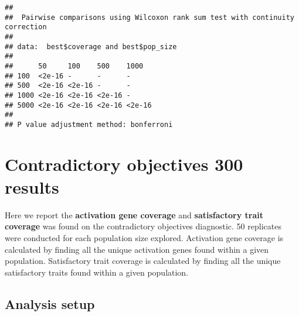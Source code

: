 \documentclass[
]{book}
\newenvironment{Shaded}{\begin{snugshade}}{\end{snugshade}}
\newcommand{\AttributeTok}[1]{\textcolor[rgb]{0.13,0.29,0.53}{#1}}
\newcommand{\CommentTok}[1]{\textcolor[rgb]{0.56,0.35,0.01}{\textit{#1}}}
\newcommand{\ConstantTok}[1]{\textcolor[rgb]{0.56,0.35,0.01}{#1}}
\newcommand{\FunctionTok}[1]{\textcolor[rgb]{0.13,0.29,0.53}{\textbf{#1}}}
\newcommand{\NormalTok}[1]{#1}
\newcommand{\OtherTok}[1]{\textcolor[rgb]{0.56,0.35,0.01}{#1}}
\newcommand{\SpecialCharTok}[1]{\textcolor[rgb]{0.81,0.36,0.00}{\textbf{#1}}}
\newcommand{\StringTok}[1]{\textcolor[rgb]{0.31,0.60,0.02}{#1}}
\begin{document}
\begin{verbatim}
## 
##  Pairwise comparisons using Wilcoxon rank sum test with continuity correction 
## 
## data:  best$coverage and best$pop_size 
## 
##      50     100    500    1000  
## 100  <2e-16 -      -      -     
## 500  <2e-16 <2e-16 -      -     
## 1000 <2e-16 <2e-16 <2e-16 -     
## 5000 <2e-16 <2e-16 <2e-16 <2e-16
## 
## P value adjustment method: bonferroni
\end{verbatim}

\hypertarget{contradictory-objectives-300-results}{%
\chapter{Contradictory objectives 300 results}\label{contradictory-objectives-300-results}}

Here we report the \textbf{activation gene coverage} and \textbf{satisfactory trait coverage} was found on the contradictory objectives diagnostic.
50 replicates were conducted for each population size explored.
Activation gene coverage is calculated by finding all the unique activation genes found within a given population.
Satisfactory trait coverage is calculated by finding all the unique satisfactory traits found within a given population.

\hypertarget{analysis-setup-3}{%
\section{Analysis setup}\label{analysis-setup-3}}

\begin{Shaded}
\end{Shaded}
\end{document}
